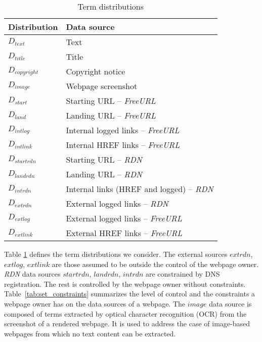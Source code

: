 \documentclass[10pt,conference,compsocconf,letterpaper]{IEEEtran}
\begin{document}
\begin{table}[tbh]
\caption{Term distributions} 
\centering
\begin{tabular}{l l}

\textbf{Distribution} & \textbf{Data source} \\ \hline
$D_{text}$ & Text \\
$D_{title}$ & Title \\
$D_{copyright}$ & Copyright notice  \\
$D_{image}$ & Webpage screenshot \\
$D_{start}$ & Starting URL  -- \textit{FreeURL} \\
$D_{land}$ & Landing URL -- \textit{FreeURL} \\
$D_{intlog}$ & Internal logged links -- \textit{FreeURL} \\
$D_{intlink}$ & Internal HREF links -- \textit{FreeURL} \\
$D_{startrdn}$ & Starting URL -- \textit{RDN} \\
$D_{landrdn}$ & Landing URL -- \textit{RDN} \\
$D_{intrdn}$ & Internal links (HREF and logged) -- \textit{RDN} \\
$D_{extrdn}$ & External logged links -- \textit{RDN} \\
$D_{extlog}$ & External logged links -- \textit{FreeURL} \\
$D_{extlink}$ & External HREF links -- \textit{FreeURL} \\


\end{tabular}
\label{tab:label_sets}
\end{table}






Table \ref{tab:label_sets} defines the term distributions we consider.
The external sources $extrdn$, $extlog$, $extlink$ are those assumed to be outside the control of the webpage owner. \textit{RDN} data sources $startrdn$, $landrdn$, $intrdn$ are constrained by DNS registration. The rest is controlled by the webpage owner without constraints.
\iffullversion
Table~\ref{tab:set_constraints} summarizes the level of control and the constraints a webpage owner has on the data sources of a webpage.
\fi
The $image$ data source is composed of terms extracted by optical character recognition (OCR) from the screenshot of a rendered webpage. 
\iffeateval
It is used to address the case of image-based webpages from which no text content can be extracted.
\fi
\end{document}
